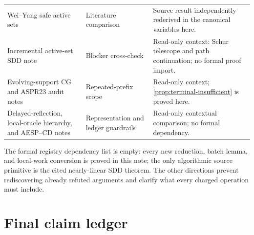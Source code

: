 \begin{center}
\begin{tabularx}{\textwidth}{@{}p{}p{}X@{}}
Wei--Yang safe active sets & Literature comparison & Source result independently
rederived in the canonical variables here. \\
Incremental active-set SDD note & Blocker cross-check & Read-only
context: Schur telescope and path continuation; no formal proof import. \\
Evolving-support CG and ASPR23 audit notes & Repeated-prefix
scope & Read-only context; \cref{prop:terminal-insufficient} is proved here. \\
Delayed-reflection, local-oracle hierarchy, and AESP--CD notes &
Representation and ledger guardrails & Read-only contextual comparison; no
formal dependency. \\
\bottomrule
\end{tabularx}
\end{center}

The formal registry dependency list is empty: every new reduction, batch
lemma, and local-work conversion is proved in this note; the only algorithmic
source primitive is the cited nearly-linear SDD theorem.  The other directions
prevent rediscovering already refuted arguments and clarify what every charged
operation must include.

\section{Final claim ledger}
\label{sec:final-ledger}

